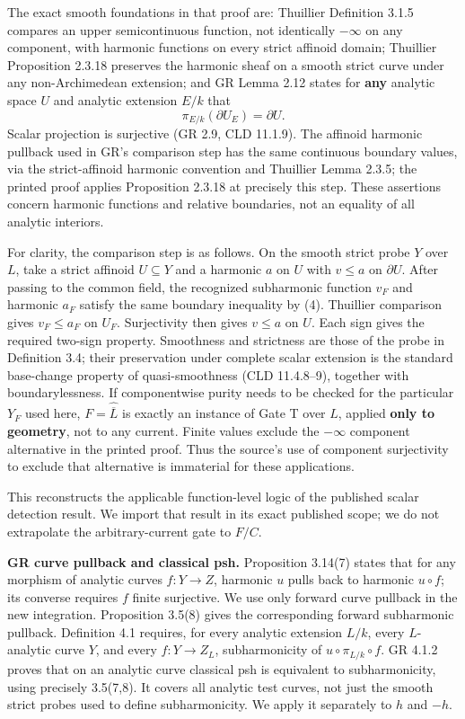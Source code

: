 \documentclass[
  11pt,
]{article}
\begin{document}
The exact smooth foundations in that proof are: Thuillier Definition
3.1.5 compares an upper semicontinuous function, not identically
\(-\infty\) on any component, with harmonic functions on every strict
affinoid domain; Thuillier Proposition 2.3.18 preserves the harmonic
sheaf on a smooth strict curve under any non-Archimedean extension; and
GR Lemma 2.12 states for \textbf{any} analytic space \(U\) and analytic
extension \(E/k\) that \[
                         \pi_{E/k}(\partial U_E)=\partial U.       \tag{4}
\] Scalar projection is surjective (GR 2.9, CLD 11.1.9). The affinoid
harmonic pullback used in GR's comparison step has the same continuous
boundary values, via the strict-affinoid harmonic convention and
Thuillier Lemma 2.3.5; the printed proof applies Proposition 2.3.18 at
precisely this step. These assertions concern harmonic functions and
relative boundaries, not an equality of all analytic interiors.

For clarity, the comparison step is as follows. On the smooth strict
probe \(Y\) over \(L\), take a strict affinoid \(U\subseteq Y\) and a
harmonic \(a\) on \(U\) with \(v\leq a\) on \(\partial U\). After
passing to the common field, the recognized subharmonic function \(v_F\)
and harmonic \(a_F\) satisfy the same boundary inequality by (4).
Thuillier comparison gives \(v_F\leq a_F\) on \(U_F\). Surjectivity then
gives \(v\leq a\) on \(U\). Each sign gives the required two-sign
property. Smoothness and strictness are those of the probe in Definition
3.4; their preservation under complete scalar extension is the standard
base-change property of quasi-smoothness (CLD 11.4.8--9), together with
boundarylessness. If componentwise purity needs to be checked for the
particular \(Y_F\) used here, \(F=\widehat{\overline L}\) is exactly an
instance of Gate T over \(L\), applied \textbf{only to geometry}, not to
any current. Finite values exclude the \(-\infty\) component alternative
in the printed proof. Thus the source's use of component surjectivity to
exclude that alternative is immaterial for these applications.

This reconstructs the applicable function-level logic of the published
scalar detection result. We import that result in its exact published
scope; we do not extrapolate the arbitrary-current gate to \(F/C\).

\textbf{GR curve pullback and classical psh.} Proposition 3.14(7) states
that for any morphism of analytic curves \(f:Y\to Z\), harmonic \(u\)
pulls back to harmonic \(u\circ f\); its converse requires \(f\) finite
surjective. We use only forward curve pullback in the new integration.
Proposition 3.5(8) gives the corresponding forward subharmonic pullback.
Definition 4.1 requires, for every analytic extension \(L/k\), every
\(L\)-analytic curve \(Y\), and every \(f:Y\to Z_L\), subharmonicity of
\(u\circ\pi_{L/k}\circ f\). GR 4.1.2 proves that on an analytic curve
classical psh is equivalent to subharmonicity, using precisely 3.5(7,8).
It covers all analytic test curves, not just the smooth strict probes
used to define subharmonicity. We apply it separately to \(h\) and
\(-h\).
\end{document}
